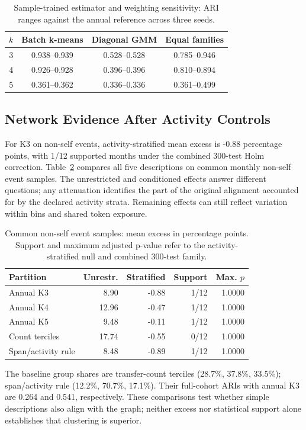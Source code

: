 \documentclass[journal,letterpaper]{IEEEtran}
\begin{document}
\begin{table}[t]
\centering\footnotesize
\caption{Sample-trained estimator and weighting sensitivity: ARI ranges against the annual reference across three seeds.}
\label{tab:algorithms}
\begin{tabular}{rccc}
\toprule
$k$ & Batch k-means & Diagonal GMM & Equal families \\
\midrule
3 & 0.938--0.939 & 0.528--0.528 & 0.785--0.946 \\
4 & 0.926--0.928 & 0.396--0.396 & 0.810--0.894 \\
5 & 0.361--0.362 & 0.336--0.336 & 0.361--0.499 \\
\bottomrule
\end{tabular}
\end{table}
\subsection{Network Evidence After Activity Controls}
For K3 on non-self events, activity-stratified mean excess is -0.88 percentage points, with 1/12 supported months under the combined 300-test Holm correction. Table~\ref{tab:conditionednetwork} compares all five descriptions on common monthly non-self event samples. The unrestricted and conditioned effects answer different questions; any attenuation identifies the part of the original alignment accounted for by the declared activity strata. Remaining effects can still reflect variation within bins and shared token exposure.

\begin{table}[t]
\centering\footnotesize
\caption{Common non-self event samples: mean excess in percentage points. Support and maximum adjusted p-value refer to the activity-stratified null and combined 300-test family.}
\label{tab:conditionednetwork}
\begin{tabular}{lrrrr}
\toprule
Partition & Unrestr. & Stratified & Support & Max. $p$ \\
\midrule
Annual K3 & 8.90 & -0.88 & 1/12 & 1.0000 \\
Annual K4 & 12.96 & -0.47 & 1/12 & 1.0000 \\
Annual K5 & 9.48 & -0.11 & 1/12 & 1.0000 \\
Count terciles & 17.74 & -0.55 & 0/12 & 1.0000 \\
Span/activity rule & 8.48 & -0.89 & 1/12 & 1.0000 \\
\bottomrule
\end{tabular}
\end{table}
The baseline group shares are transfer-count terciles (28.7\%, 37.8\%, 33.5\%); span/activity rule (12.2\%, 70.7\%, 17.1\%). Their full-cohort ARIs with annual K3 are 0.264 and 0.541, respectively. These comparisons test whether simple descriptions also align with the graph; neither excess nor statistical support alone establishes that clustering is superior.
\end{document}
